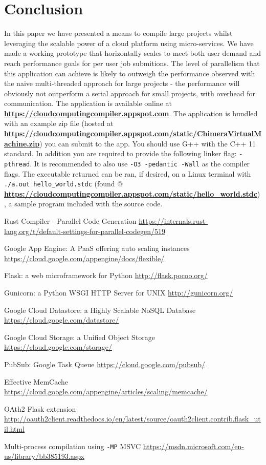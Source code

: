 \documentclass[conference]{IEEEtran}
\begin{document}
\section{Conclusion}
In this paper we have presented a means to compile large projects whilst
leveraging the scalable power of a cloud platform using micro-services. We have
made a working prototype that horizontally scales to
meet both user demand and reach performance goals for per user job submitions.
The level of parallelism that this application can achieve is likely to outweigh
the performance observed with the naive multi-threaded approach for large
projects - the performance will obviously not outperform a serial approach for
small projects, with overhead for communication.
The application is available online at
\textbf{\url{https://cloudcomputingcompiler.appspot.com}}.
The application is bundled with an example zip file (hosted at \textbf{\url{https://cloudcomputingcompiler.appspot.com/static/ChimeraVirtualMachine.zip}}) you can submit to the app.
You should use G++ with the C++ 11 standard. In addition you are required to provide
the following linker flag: \texttt{-pthread}. It is recommended to also use
\texttt{-O3 -pedantic -Wall} as the compiler flags. The executable returned can
be ran, if desired, on a Linux terminal with \texttt{./a.out
hello\_world.stdc} (found @ \textbf{\url{https://cloudcomputingcompiler.appspot.com/static/hello_world.stdc}}), a sample program included with the source code.

\begin{thebibliography}{00}

    Rust Compiler - Parallel Code Generation
    \url{https://internals.rust-lang.org/t/default-settings-for-parallel-codegen/519}


    Google App Engine: A PaaS offering auto scaling instances
    \url{https://cloud.google.com/appengine/docs/flexible/}

    Flask: a web microframework for Python
    \url{http://flask.pocoo.org/}

    Gunicorn: a Python WSGI HTTP Server for UNIX
    \url{http://gunicorn.org/}

    Google Cloud Datastore: a Highly Scalable NoSQL Database
    \url{https://cloud.google.com/datastore/}

    Google Cloud Storage: a Unified Object Storage
    \url{https://cloud.google.com/storage/}

   PubSub: Google Task Queue
    \url{https://cloud.google.com/pubsub/}

   Effective MemCache
    \url{https://cloud.google.com/appengine/articles/scaling/memcache/} 

   OAth2 Flask extension
    \url{http://oauth2client.readthedocs.io/en/latest/source/oauth2client.contrib.flask_util.html}

 	Multi-process compilation using \texttt{-MP} MSVC
 	\url{https://msdn.microsoft.com/en-us/library/bb385193.aspx}

\end{thebibliography}
\end{document}
